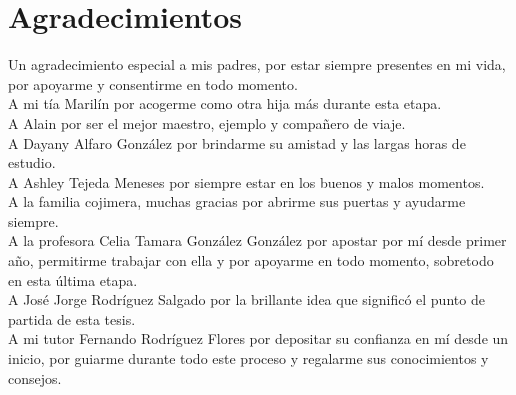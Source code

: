 \chapter*{Agradecimientos}\label{chapter:agradecimientos}

Un agradecimiento especial a mis padres, por estar siempre presentes en mi vida, por apoyarme y consentirme en todo momento.\\

A mi tía Marilín por acogerme como otra hija más durante esta etapa. \\

A Alain por ser el mejor maestro, ejemplo y compañero de viaje.\\

A Dayany Alfaro González por brindarme su amistad y las largas horas de estudio. \\

A Ashley Tejeda Meneses por siempre estar en los buenos y malos momentos. \\

A la familia cojimera, muchas gracias por abrirme sus puertas y ayudarme siempre.\\

A la profesora Celia Tamara González González por apostar por mí desde primer año, permitirme trabajar con ella y por apoyarme en todo momento, sobretodo en esta última etapa. \\ 

A José Jorge Rodríguez Salgado por la brillante idea que significó el punto de partida de esta tesis.\\

A mi tutor Fernando Rodríguez Flores por depositar su confianza en mí desde un inicio, por guiarme durante todo este proceso y regalarme sus conocimientos y consejos.\\








